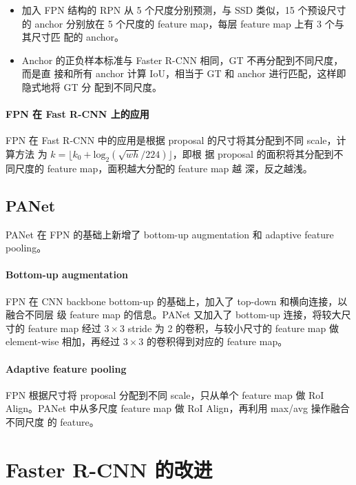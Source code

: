 \begin{itemize}
  \item 加入 FPN 结构的 RPN 从 5 个尺度分别预测，与 SSD 类似，15 个预设尺寸的
    anchor 分别放在 5 个尺度的 feature map，每层 feature map 上有 3 个与其尺寸匹
    配的 anchor。
  \item Anchor 的正负样本标准与 Faster R-CNN 相同，GT 不再分配到不同尺度，而是直
    接和所有 anchor 计算 IoU，相当于 GT 和 anchor 进行匹配，这样即隐式地将 GT 分
    配到不同尺度。
\end{itemize}

\paragraph{FPN 在 Fast R-CNN 上的应用}

FPN 在 Fast R-CNN 中的应用是根据 proposal 的尺寸将其分配到不同 scale，计算方法
为 $ k = \lfloor k_0 + \mathrm{log}_2 ( \sqrt{wh}/224 ) \rfloor$，即根
据 proposal 的面积将其分配到不同尺度的 feature map，面积越大分配的 feature map 越
深，反之越浅。

\subsection{PANet}
PANet 在 FPN 的基础上新增了 bottom-up augmentation 和 adaptive feature pooling\cite{2018-PANet}。

\paragraph{Bottom-up augmentation}
FPN 在 CNN backbone bottom-up 的基础上，加入了 top-down 和横向连接，以融合不同层
级 feature map 的信息。PANet 又加入了 bottom-up 连接，将较大尺寸的 feature map
经过 $3 \times 3$ stride 为 2 的卷积，与较小尺寸的 feature map 做 element-wise
相加，再经过 $3 \times 3$ 的卷积得到对应的 feature map。

\paragraph{Adaptive feature pooling}
FPN 根据尺寸将 proposal 分配到不同 scale，只从单个 feature map 做 RoI
Align。PANet 中从多尺度 feature map 做 RoI Align，再利用 max/avg 操作融合不同尺度
的 feature。

\section{Faster R-CNN 的改进}
\label{sec:faster-improve}

